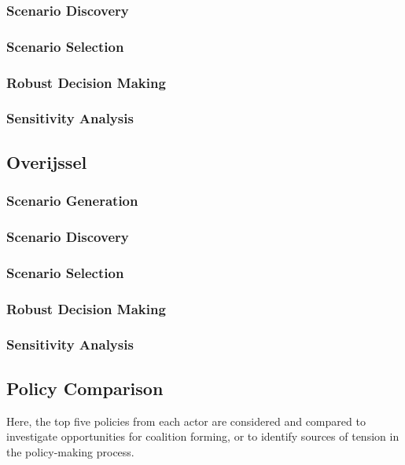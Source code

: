 \subsubsection{Scenario Discovery}
\subsubsection{Scenario Selection}
\subsubsection{Robust Decision Making}
\subsubsection{Sensitivity Analysis}

\subsection{Overijssel}
\subsubsection{Scenario Generation}
\subsubsection{Scenario Discovery}
\subsubsection{Scenario Selection}
\subsubsection{Robust Decision Making}
\subsubsection{Sensitivity Analysis}

\subsection{Policy Comparison}
Here, the top five policies from each actor are considered and compared to investigate opportunities for coalition forming, or to identify sources of tension in the policy-making process.